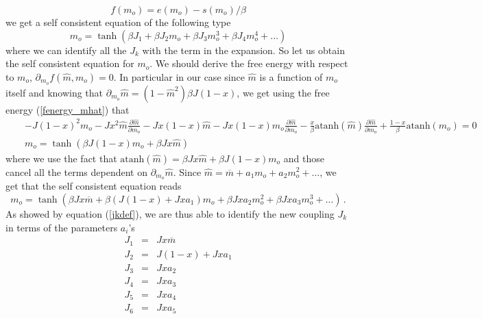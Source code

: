 \documentclass[aps,pre,noshowpacs]{revtex4}
\begin{document}
\begin{equation}
f(m_o)=e(m_o)- s(m_o)/\beta
\end{equation}
we get a self consistent equation of the following type 
\begin{equation}\label{jkdef}
m_o=\tanh( \beta J_1 + \beta J_2 m_o + \beta J_3 m_o^3 + \beta J_4 m_o^4 +\ldots)
\end{equation}
where we can identify all the $J_k$ with the term in the expansion.
So let us obtain the self consistent equation for $m_o$. We should derive the free energy with respect to $m_o$, $\partial_{m_o} f(\hat{m},m_o)=0$.  In particular in our case since $\hat{m}$ is a function of $m_o$ itself and knowing that $\partial_{m_o} \hat{m} = (1-\hat{m}^2) \beta J (1-x)$, we get using the free energy (\ref{fenergy_mhat}) that
\begin{eqnarray}
&&- J (1-x)^2 m_o - J x^2 \hat{m}\frac{ \partial \hat{m}}{\partial m_o} - J x (1-x) \hat{m} - J x (1-x) m_o \frac{ \partial \hat{m}}{\partial m_o} - \frac{x}{\beta} \mbox{atanh}(\hat{m}) \frac{ \partial \hat{m}}{\partial m_o} + \frac{1-x}{\beta} \mbox{atanh}(m_o)=0\nonumber\\
 &&m_o= \tanh\left(\beta J (1-x) m_o + \beta J x \hat{m}\right) 
\end{eqnarray}
where we use the fact that $\mbox{atanh}(\hat{m})=\beta J x \hat{m} + \beta J (1-x) m_o$ and those cancel all the terms dependent on $\partial_{m_o} \hat{m}$. 
Since $\hat{m}=\overline{m} + a_1 m_o + a_2 m_o^2 + \ldots $, we get that the self consistent equation reads
$$ m_o=\tanh\left(\beta J x \overline{m}+ \beta (J (1-x) +J x a_1 ) m_o + \beta J x a_2 m_o^2 + \beta J x a_3 m_o^3 + \ldots \right)\,.$$ As showed by equation (\ref{jkdef}), we are thus able to identify the new coupling $J_k$ in terms of the parameters $a_i$'s
\begin{eqnarray}\label{renJ1hT}
J_1&=& J x \overline{m} \nonumber\\
J_2&=&  J(1-x) + Jx a_1\nonumber\\
J_3&=&Jx a_2\nonumber\\
J_4&=& J xa_3\nonumber\\
J_5&=&Jx a_4\nonumber\\
J_6&=&Jx a_5\nonumber\\
\end{eqnarray}
\end{document}
